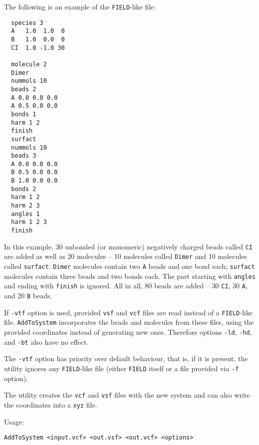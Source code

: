 The following is an example of the \texttt{FIELD}-like file:
\begin{verbatim}
  species 3
  A   1.0  1.0  0
  B   1.0  0.0  0
  CI  1.0 -1.0 30

  molecule 2
  Dimer
  nummols 10
  beads 2
  A 0.0 0.0 0.0
  A 0.5 0.0 0.0
  bonds 1
  harm 1 2
  finish
  surfact
  nummols 10
  beads 3
  A 0.0 0.0 0.0
  B 0.5 0.0 0.0
  B 1.0 0.0 0.0
  bonds 2
  harm 1 2
  harm 2 3
  angles 1
  harm 1 2 3
  finish
\end{verbatim}
In this example, 30 unbonded (or monomeric) negatively charged beads called
\texttt{CI} are added as well as 20 molecules -- 10 molecules called
\texttt{Dimer} and 10 molecules called \texttt{surfact}. \texttt{Dimer}
molecules contain two \texttt{A} beads and one bond each; \texttt{surfact}
molecules contain three beads and two bonds each. The part starting with
\texttt{angles} and ending with \texttt{finish} is ignored. All in all, 80
beads are added -- 30 \texttt{CI}, 30 \texttt{A}, and 20 \texttt{B} beads.

If \texttt{-vtf} option is used, provided \texttt{vsf} and \texttt{vcf}
files are read instead of a \texttt{FIELD}-like file. \texttt{AddToSystem}
incorporates the beads and molecules from these files, using the provided
coordinates instead of generating new ones. Therefore options \texttt{-ld},
\texttt{-hd}, and \texttt{-bt} also have no effect.

The \texttt{-vtf} option has priority over default behaviour, that is, if
it is present, the utility ignores any \texttt{FIELD}-like file (either
\texttt{FIELD} itself or a file provided via \texttt{-f} option).

The utility creates the \texttt{vcf} and \texttt{vsf} files with the new
system and can also write the coordinates into a \texttt{xyz} file.

Usage:

\vspace{1em}
\noindent
\texttt{AddToSystem <input.vcf> <out.vsf> <out.vcf> <options>}

